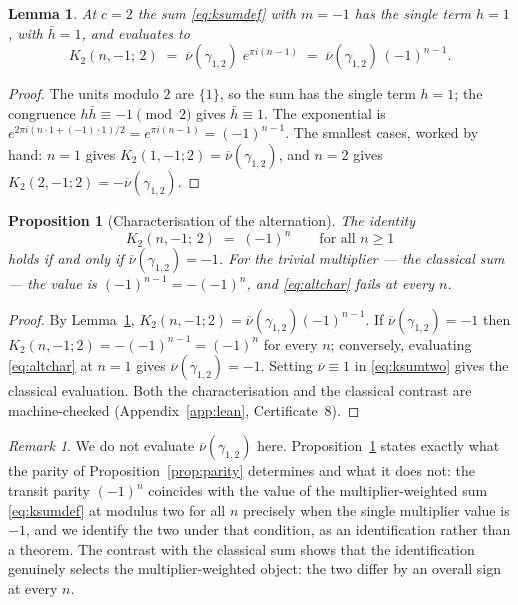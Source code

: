 \documentclass[11pt,a4paper]{article}
\theoremstyle{plain}
\newtheorem{lemma}[theorem]{Lemma}
\newtheorem{proposition}[theorem]{Proposition}
\theoremstyle{definition}
\theoremstyle{remark}
\newtheorem{remark}[theorem]{Remark}
\begin{document}
\begin{lemma}\label{lem:ksumtwo}
At $c = 2$ the sum \eqref{eq:ksumdef} with $m = -1$ has the single term $h = 1$, with $\bar h = 1$, and evaluates to
\begin{equation}\label{eq:ksumtwo}
K_2(n, -1;\, 2) \;=\;
\overline{\nu}(\gamma_{1,2})\; e^{\pi i (n-1)} \;=\;
\overline{\nu}(\gamma_{1,2})\,(-1)^{n-1} .
\end{equation}
\end{lemma}

\begin{proof}
The units modulo $2$ are $\{1\}$, so the sum has the single term $h = 1$; the congruence $h\bar h \equiv -1 \pmod 2$ gives $\bar h \equiv 1$. The exponential is $e^{2\pi i (n \cdot 1 + (-1) \cdot 1)/2} = e^{\pi i (n-1)} = (-1)^{n-1}$. The smallest cases, worked by hand: $n = 1$ gives $K_2(1,-1;2) = \overline{\nu}(\gamma_{1,2})$, and $n = 2$ gives $K_2(2,-1;2) = -\overline{\nu}(\gamma_{1,2})$.
\end{proof}

\begin{proposition}[Characterisation of the
alternation]\label{prop:altchar} The identity
\begin{equation}\label{eq:altchar}
K_2(n, -1;\, 2) \;=\; (-1)^n \qquad \text{for all } n \ge 1
\end{equation}
holds if and only if $\overline{\nu}(\gamma_{1,2}) = -1$. For the trivial multiplier --- the classical sum --- the value is $(-1)^{n-1} = -(-1)^n$, and \eqref{eq:altchar} fails at every $n$.
\end{proposition}

\begin{proof}
By Lemma~\ref{lem:ksumtwo}, $K_2(n,-1;2) = \overline{\nu}(\gamma_{1,2})(-1)^{n-1}$. If $\overline{\nu}(\gamma_{1,2}) = -1$ then $K_2(n,-1;2) = -(-1)^{n-1} = (-1)^n$ for every $n$; conversely, evaluating \eqref{eq:altchar} at $n = 1$ gives $\overline{\nu}(\gamma_{1,2}) = -1$. Setting $\overline{\nu} \equiv 1$ in \eqref{eq:ksumtwo} gives the classical evaluation. Both the characterisation and the classical contrast are machine-checked (Appendix~\ref{app:lean}, Certificate~8).
\end{proof}

\begin{remark}\label{rem:mult}
We do not evaluate $\overline{\nu}(\gamma_{1,2})$ here. Proposition~\ref{prop:altchar} states exactly what the parity of Proposition~\ref{prop:parity} determines and what it does not: the transit parity $(-1)^n$ coincides with the value of the multiplier-weighted sum \eqref{eq:ksumdef} at modulus two for all $n$ precisely when the single multiplier value is $-1$, and we identify the two under that condition, as an identification rather than a theorem. The contrast with the classical sum shows that the identification genuinely selects the multiplier-weighted object: the two differ by an overall sign at every $n$.
\end{remark}
\end{document}
